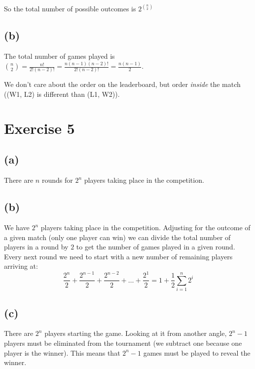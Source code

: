 \documentclass{article}
\begin{document}
So the total number of possible outcomes is \(2^{\binom{n}{2}}\)
\subsection*{(b)}
The total number of games played is \(\binom{n}{2} = \frac{n!}{2!(n - 2)!} = \frac{n(n-1)(n-2)!}{2!(n-2)!} = \frac{n(n-1)}{2}\).

We don't care about the order on the leaderboard, but order \emph{inside} the match
((W1, L2) is different than (L1, W2)).

\section*{Exercise 5}
\subsection*{(a)}
There are \(n\) rounds for \(2^n\) players taking place in the competition.

\subsection*{(b)}
We have \(2^n\) players taking place in the competition. Adjusting for the outcome of a given match (only one player can win)
we can divide the total number of players in a round by \(2\) to get the number of games played in a given round. Every next
round we need to start with a new number of remaining players arriving at:
\begin{equation*}
    \frac{2^n}{2} + \frac{2^{n-1}}{2} + \frac{2^{n-2}}{2} + \dots + \frac{2^1}{2} = 1 + \frac{1}{2} \sum_{i=1}^{n} 2^i
\end{equation*}

\subsection*{(c)}
There are \(2^n\) players starting the game. Looking at it from another angle, \(2^{n} - 1\) players must be eliminated
from the tournament (we subtract one because one player is the winner). This means that \(2^{n} - 1\) games
must be played to reveal the winner.
\newpage
\end{document}
